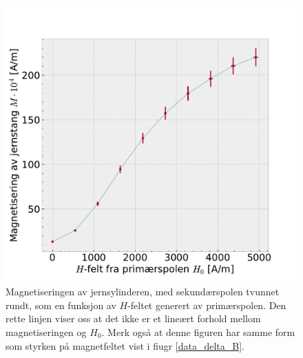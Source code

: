 \documentclass[%
 reprint,
 amsmath,amssymb,
 aps,
 norsk,
]{revtex4-1}
\begin{document}
\begin{figure}[h!]
  \centering
  \includegraphics[scale=0.45]{magnetisering.pdf}
  \caption{Magnetiseringen av jernsylinderen, med sekundærspolen tvunnet rundt, som en funksjon av $H$-feltet generert av primærspolen. Den rette linjen viser oss at det ikke er et lineært forhold mellom magnetiseringen og $H_0$. Merk også at denne figuren har samme form som styrken på magnetfeltet vist i fiugr \vref{data_delta_B}.}
  \label{MH0}
\end{figure}
\end{document}
